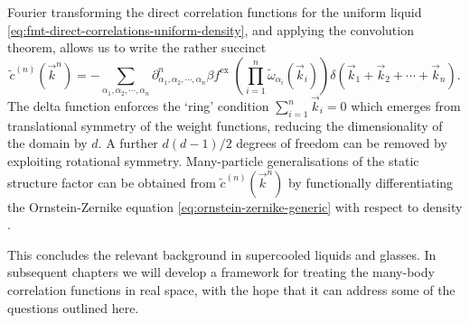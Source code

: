 \documentclass[11pt,twoside]{report}
\def\includebibliography{}
\begin{document}
Fourier transforming the direct correlation functions for the uniform liquid \eqref{eq:fmt-direct-correlations-uniform-density}, and applying the convolution theorem, allows us to write the rather succinct
\begin{equation}
  \tilde{c}^{(n)}(\vec{k}^n)
  =
  - \sum_{\alpha_1, \alpha_2, \cdots, \alpha_n}
  \partial^n_{\alpha_1, \alpha_2, \cdots, \alpha_n} \beta f^\mathrm{ex} \;
  \left( \prod_{i=1}^n \widetilde{\omega}_{\alpha_i}(\vec{k}_i) \right)
  \delta(\vec{k}_1 + \vec{k}_2 + \cdots + \vec{k}_n).
\end{equation}
The delta function enforces the `ring' condition $\sum_{i=1}^n \vec{k}_i = 0$ which emerges from translational symmetry of the weight functions, reducing the dimensionality of the domain by $d$.
A further $d(d-1)/2$ degrees of freedom%
can be removed by exploiting rotational symmetry.
Many-particle generalisations of the static structure factor can be obtained from $\tilde{c}^{(n)}(\vec{k}^n)$ by functionally differentiating the Ornstein-Zernike equation \eqref{eq:ornstein-zernike-generic} with respect to density \cite{BarratMP1988}.

This concludes the relevant background in supercooled liquids and glasses.
In subsequent chapters we will develop a framework for treating the many-body correlation functions in real space, with the hope that it can address some of the questions outlined here.

\ifdefined\includebibliography
  \printbibliography
\fi
\end{document}
